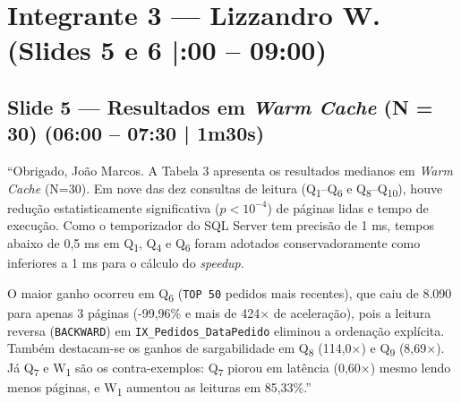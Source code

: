 \documentclass[10pt,a4paper]{article}
\begin{document}
\section{Integrante 3 — Lizzandro W. (Slides 5 e 6 \enspace|:00 – 09:00)}

\subsection{Slide 5 — Resultados em \textit{Warm Cache} (N = 30) (06:00 – 07:30 | 1m30s)}
\begin{fala}
``Obrigado, João Marcos. A Tabela 3 apresenta os resultados medianos em \textit{Warm Cache} (N=30). Em nove das dez consultas de leitura (Q\textsubscript{1}–Q\textsubscript{6} e Q\textsubscript{8}–Q\textsubscript{10}), houve redução estatisticamente significativa ($p < 10^{-4}$) de páginas lidas e tempo de execução. Como o temporizador do SQL Server tem precisão de 1 ms, tempos abaixo de 0,5 ms em Q\textsubscript{1}, Q\textsubscript{4} e Q\textsubscript{6} foram adotados conservadoramente como inferiores a 1 ms para o cálculo do \textit{speedup}.

O maior ganho ocorreu em Q\textsubscript{6} (\texttt{TOP 50} pedidos mais recentes), que caiu de 8.090 para apenas 3 páginas (-99,96\% e mais de 424$\times$ de aceleração), pois a leitura reversa (\texttt{BACKWARD}) em \texttt{IX\_Pedidos\_DataPedido} eliminou a ordenação explícita. Também destacam-se os ganhos de sargabilidade em Q\textsubscript{8} (114,0$\times$) e Q\textsubscript{9} (8,69$\times$). Já Q\textsubscript{7} e W\textsubscript{1} são os contra-exemplos: Q\textsubscript{7} piorou em latência (0,60$\times$) mesmo lendo menos páginas, e W\textsubscript{1} aumentou as leituras em 85,33\%.''
\end{fala}
\end{document}
